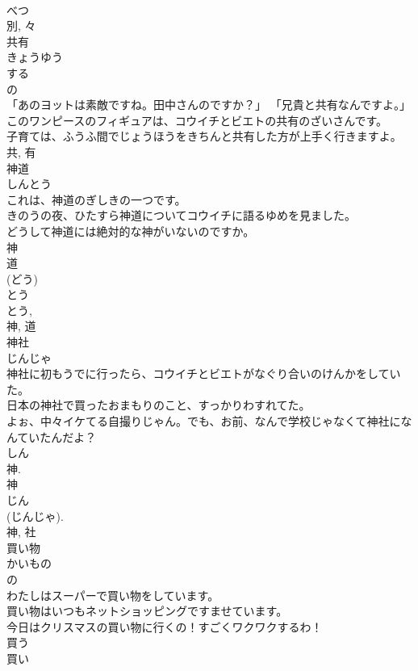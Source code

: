 \documentclass[8pt]{extreport}
\begin{document}
\begin{CJK}{UTF8}{min}
\\	べつ 
\\	別, 々	
\\	共有	
\\	きょうゆう	
\\	する 
\\	の 
\\	「あのヨットは素敵ですね。田中さんのですか？」 「兄貴と共有なんですよ。」	
\\	このワンピースのフィギュアは、コウイチとビエトの共有のざいさんです。	
\\	子育ては、ふうふ間でじょうほうをきちんと共有した方が上手く行きますよ。	
\\	共, 有	
\\	神道	
\\	しんとう	
\\	これは、神道のぎしきの一つです。	
\\	きのうの夜、ひたすら神道についてコウイチに語るゆめを見ました。	
\\	どうして神道には絶対的な神がいないのですか。	
\\	神 
\\	道 
\\	(どう) 
\\	とう 
\\	とう, 
\\	神, 道	
\\	神社	
\\	じんじゃ	
\\	神社に初もうでに行ったら、コウイチとビエトがなぐり合いのけんかをしていた。	
\\	日本の神社で買ったおまもりのこと、すっかりわすれてた。	
\\	よぉ、中々イケてる自撮りじゃん。でも、お前、なんで学校じゃなくて神社になんていたんだよ？	
\\	しん 
\\	神.
\\	神 
\\	じん 
\\	(じんじゃ). 
\\	神, 社	
\\	買い物	
\\	かいもの	
\\	の 
\\	わたしはスーパーで買い物をしています。	
\\	買い物はいつもネットショッピングですませています。	
\\	今日はクリスマスの買い物に行くの！すごくワクワクするわ！	
\\	買う 
\\	買い 

\end{CJK}
\end{document}
